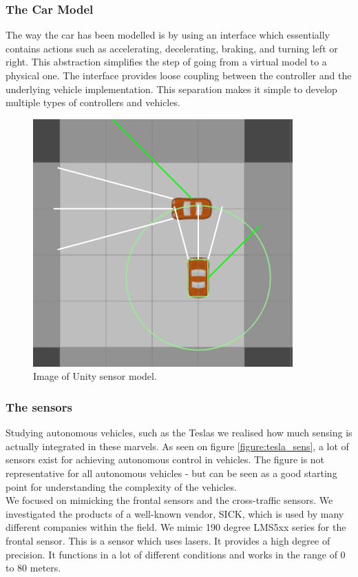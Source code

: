 \subsubsection{The Car Model}
The way the car has been modelled is by using an interface which essentially contains actions such as accelerating, decelerating, braking, and turning left or right.
This abstraction simplifies the step of going from a virtual model to a physical one.
The interface provides loose coupling between the controller and the underlying vehicle implementation.
This separation makes it simple to develop multiple types of controllers and vehicles.\\

\begin{figure}
\centering
\includegraphics[scale=.5]{img/sensors}
\caption{Image of Unity sensor model.}
\label{figure:unity_sens}
\end{figure}

\subsubsection*{The sensors}
Studying autonomous vehicles, such as the Teslas we realised how much sensing is actually integrated in these marvels.
As seen on figure \ref{figure:tesla_sens}, a lot of sensors exist for achieving autonomous control in vehicles.
The figure is not representative for all autonomous vehicles - but can be seen as a good starting point for understanding the complexity of the vehicles.\\

We focused on mimicking the frontal sensors and the cross-traffic sensors.
We investigated the products of a well-known vendor, SICK, which is used by many different companies within the field.
We mimic 190 degree LMS5xx series for the frontal sensor. This is a sensor which uses lasers. It provides a high degree of precision. It functions in a lot of different conditions and works in the range of 0 to 80 meters\cite{sick}.\\

